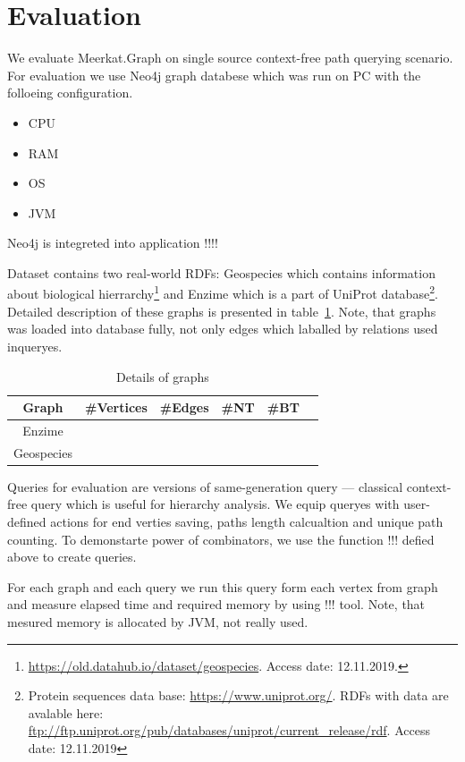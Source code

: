 \section{Evaluation}

We evaluate Meerkat.Graph on single source context-free path querying scenario.
For evaluation we use Neo4j graph databese which was run on PC with the folloeing configuration.
\begin{itemize}
  \item CPU
  \item RAM
  \item OS
  \item JVM
\end{itemize}

Neo4j is integreted into application !!!!

Dataset contains two real-world RDFs: Geospecies which contains information about biological hierrarchy\footnote{\url{https://old.datahub.io/dataset/geospecies}. Access date: 12.11.2019.} and Enzime which is a part of UniProt database\footnote{Protein sequences data base: \url{https://www.uniprot.org/}. RDFs with data are avalable here: \url{ftp://ftp.uniprot.org/pub/databases/uniprot/current_release/rdf}. Access date: 12.11.2019}.
Detailed description of these graphs is presented in table~\ref{tbl:datasetDetails}.
Note, that graphs was loaded into database fully, not only edges which laballed by relations used inqueryes.

\begin{table}[ht]
\begin{tabular}{|c|c|c|c|c|c|}
\hline
 Graph & \#Vertices & \#Edges & \#NT & \#BT \\
 \hline
 Enzime &  &  &  &  \\
 Geospecies &  &  &  &  \\
 \hline
\end{tabular}
\caption{Details of graphs}
\label{tbl:datasetDetails}
\end{table}

Queries for evaluation are versions of same-generation query --- classical context-free query which is useful for hierarchy analysis.
We equip queryes with user-defined actions for end verties saving, paths length calcualtion and unique path counting.
To demonstarte power of combinators, we use the function !!! defied above to create queries.

For each graph and each query we run this query form each vertex from graph and measure elapsed time and required memory by using !!! tool.
Note, that mesured memory is allocated by JVM, not really used.



